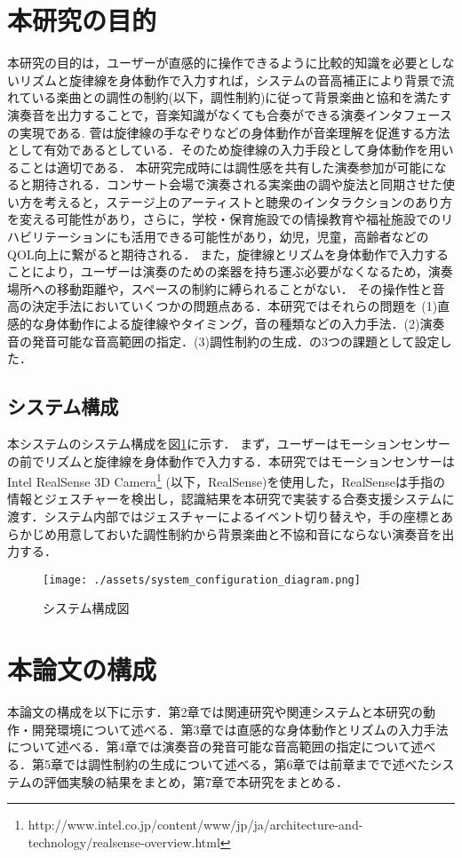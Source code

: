 \section{本研究の目的}
本研究の目的は，ユーザーが直感的に操作できるように比較的知識を必要としないリズムと旋律線を身体動作で入力すれば，システムの音高補正により背景で流れている楽曲との調性の制約(以下，調性制約)に従って背景楽曲と協和を満たす演奏音を出力することで，音楽知識がなくても合奏ができる演奏インタフェースの実現である. 菅\cite{suga2008}は旋律線の手なぞりなどの身体動作が音楽理解を促進する方法として有効であるとしている．そのため旋律線の入力手段として身体動作を用いることは適切である．
本研究完成時には調性感を共有した演奏参加が可能になると期待される．コンサート会場で演奏される実楽曲の調や旋法と同期させた使い方を考えると，ステージ上のアーティストと聴衆のインタラクションのあり方を変える可能性があり，さらに，学校・保育施設での情操教育や福祉施設でのリハビリテーションにも活用できる可能性があり，幼児，児童，高齢者などのQOL向上に繋がると期待される．
また，旋律線とリズムを身体動作で入力することにより，ユーザーは演奏のための楽器を持ち運ぶ必要がなくなるため，演奏場所への移動距離や，スペースの制約に縛られることがない．
その操作性と音高の決定手法においていくつかの問題点ある．本研究ではそれらの問題を
(1)直感的な身体動作による旋律線やタイミング，音の種類などの入力手法．(2)演奏音の発音可能な音高範囲の指定．(3)調性制約の生成．の3つの課題として設定した．
\subsection{システム構成}
本システムのシステム構成を図\ref{img:sys_const}に示す．
まず，ユーザーはモーションセンサーの前でリズムと旋律線を身体動作で入力する．本研究ではモーションセンサーはIntel RealSense 3D Camera\footnote{http://www.intel.co.jp/content/www/jp/ja/architecture-and-technology/realsense-overview.html} (以下，RealSense)を使用した，RealSenseは手指の情報とジェスチャーを検出し，認識結果を本研究で実装する合奏支援システムに渡す．システム内部ではジェスチャーによるイベント切り替えや，手の座標とあらかじめ用意しておいた調性制約から背景楽曲と不協和音にならない演奏音を出力する．
\begin{figure}[t]
	\begin{center}
		\texttt{[image: ./assets/system\_configuration\_diagram.png]}
		\caption{システム構成図}
		\label{img:sys_const}
	\end{center}
\end{figure}
\section{本論文の構成}
本論文の構成を以下に示す．第2章では関連研究や関連システムと本研究の動作・開発環境について述べる．第3章では直感的な身体動作とリズムの入力手法について述べる．第4章では演奏音の発音可能な音高範囲の指定について述べる．第5章では調性制約の生成について述べる，第6章では前章までで述べたシステムの評価実験の結果をまとめ，第7章で本研究をまとめる．
